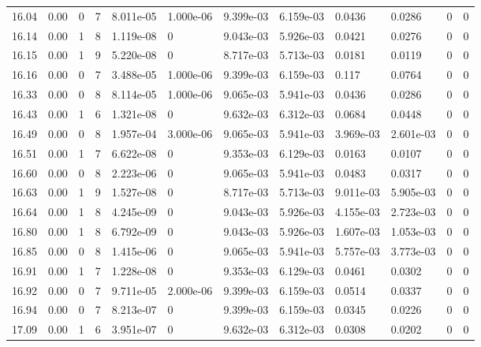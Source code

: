\documentclass[preview]{standalone}
\begin{document}
{{{{{{\begin{tabular}{L{1.2cm}C{1.2cm} C{0.3cm}C{0.5cm} C{1.4cm}C{1.4cm} C{1.4cm}C{1.4cm} C{1.6cm}C{1.6cm} C{1.6cm}C{1.6cm}}
  16.04  &  0.00  & 0     &  7 &  8.011e-05  & 1.000e-06  &  9.399e-03&   6.159e-03& 0.0436 & 0.0286   &  0 & 0  \\ 
  16.14  &  0.00  & 1     &  8 &  1.119e-08  & 0  &  9.043e-03&   5.926e-03& 0.0421 & 0.0276   &  0 & 0  \\ 
  16.15  &  0.00  & 1     &  9 &  5.220e-08  & 0  &  8.717e-03&   5.713e-03& 0.0181 & 0.0119   &  0 & 0  \\ 
  16.16  &  0.00  & 0     &  7 &  3.488e-05  & 1.000e-06  &  9.399e-03&   6.159e-03& 0.117 & 0.0764   &  0 & 0  \\ 
  16.33  &  0.00  & 0     &  8 &  8.114e-05  & 1.000e-06  &  9.065e-03&   5.941e-03& 0.0436 & 0.0286   &  0 & 0  \\ 
  16.43  &  0.00  & 1     &  6 &  1.321e-08  & 0  &  9.632e-03&   6.312e-03& 0.0684 & 0.0448   &  0 & 0  \\ 
  16.49  &  0.00  & 0     &  8 &  1.957e-04  & 3.000e-06  &  9.065e-03&   5.941e-03& 3.969e-03 & 2.601e-03   &  0 & 0  \\ 
  16.51  &  0.00  & 1     &  7 &  6.622e-08  & 0  &  9.353e-03&   6.129e-03& 0.0163 & 0.0107   &  0 & 0  \\ 
  16.60  &  0.00  & 0     &  8 &  2.223e-06  & 0  &  9.065e-03&   5.941e-03& 0.0483 & 0.0317   &  0 & 0  \\ 
  16.63  &  0.00  & 1     &  9 &  1.527e-08  & 0  &  8.717e-03&   5.713e-03& 9.011e-03 & 5.905e-03   &  0 & 0  \\ 
  16.64  &  0.00  & 1     &  8 &  4.245e-09  & 0  &  9.043e-03&   5.926e-03& 4.155e-03 & 2.723e-03   &  0 & 0  \\ 
  16.80  &  0.00  & 1     &  8 &  6.792e-09  & 0  &  9.043e-03&   5.926e-03& 1.607e-03 & 1.053e-03   &  0 & 0  \\ 
  16.85  &  0.00  & 0     &  8 &  1.415e-06  & 0  &  9.065e-03&   5.941e-03& 5.757e-03 & 3.773e-03   &  0 & 0  \\ 
  16.91  &  0.00  & 1     &  7 &  1.228e-08  & 0  &  9.353e-03&   6.129e-03& 0.0461 & 0.0302   &  0 & 0  \\ 
  16.92  &  0.00  & 0     &  7 &  9.711e-05  & 2.000e-06  &  9.399e-03&   6.159e-03& 0.0514 & 0.0337   &  0 & 0  \\ 
  16.94  &  0.00  & 0     &  7 &  8.213e-07  & 0  &  9.399e-03&   6.159e-03& 0.0345 & 0.0226   &  0 & 0  \\ 
  17.09  &  0.00  & 1     &  6 &  3.951e-07  & 0  &  9.632e-03&   6.312e-03& 0.0308 & 0.0202   &  0 & 0  \\ 

\end{tabular}}}}}}}
\end{document}

